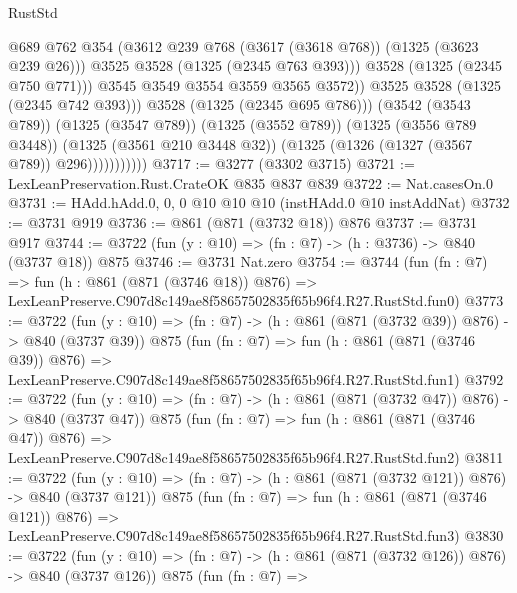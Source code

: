 \begin{lexlean}{RustStd}
\begin{coremodule}
                                  @689
                                  @762
                                  @354
                                  (@3612 @239 @768 (@3617 (@3618 @768)) (@1325 (@3623 @239 @26)))
                                  @3525
                                  @3528
                                  (@1325 (@2345 @763 @393)))
                                @3528
                                (@1325 (@2345 @750 @771)))
                              @3545
                              @3549
                              @3554
                              @3559
                              @3565
                              @3572))
                          @3525
                          @3528
                          (@1325 (@2345 @742 @393)))
                        @3528
                        (@1325 (@2345 @695 @786)))
                      (@3542 (@3543 @789))
                      (@1325 (@3547 @789))
                      (@1325 (@3552 @789))
                      (@1325 (@3556 @789 @3448))
                      (@1325 (@3561 @210 @3448 @32))
                      (@1325 (@1326 (@1327 (@3567 @789)) @296)))))))))))
@3717 := @3277 (@3302 @3715)
@3721 := LexLeanPreservation.Rust.CrateOK @835 @837 @839
@3722 := Nat.casesOn.{0}
@3731 := HAdd.hAdd.{0, 0, 0} @10 @10 @10 (instHAdd.{0} @10 instAddNat)
@3732 := @3731 @919
@3736 := @861 (@871 (@3732 @18)) @876
@3737 := @3731 @917
@3744 := @3722 (fun (y : @10) => (fn : @7) -> (h : @3736) -> @840 (@3737 @18)) @875
@3746 := @3731 Nat.zero
@3754 := @3744
    (fun (fn : @7) =>
    fun (h : @861 (@871 (@3746 @18)) @876) =>
    LexLeanPreserve.C907d8c149ae8f58657502835f65b96f4.R27.RustStd.fun0)
@3773 := @3722
    (fun (y : @10) => (fn : @7) -> (h : @861 (@871 (@3732 @39)) @876) -> @840 (@3737 @39))
    @875
    (fun (fn : @7) =>
    fun (h : @861 (@871 (@3746 @39)) @876) =>
    LexLeanPreserve.C907d8c149ae8f58657502835f65b96f4.R27.RustStd.fun1)
@3792 := @3722
    (fun (y : @10) => (fn : @7) -> (h : @861 (@871 (@3732 @47)) @876) -> @840 (@3737 @47))
    @875
    (fun (fn : @7) =>
    fun (h : @861 (@871 (@3746 @47)) @876) =>
    LexLeanPreserve.C907d8c149ae8f58657502835f65b96f4.R27.RustStd.fun2)
@3811 := @3722
    (fun (y : @10) => (fn : @7) -> (h : @861 (@871 (@3732 @121)) @876) -> @840 (@3737 @121))
    @875
    (fun (fn : @7) =>
    fun (h : @861 (@871 (@3746 @121)) @876) =>
    LexLeanPreserve.C907d8c149ae8f58657502835f65b96f4.R27.RustStd.fun3)
@3830 := @3722
    (fun (y : @10) => (fn : @7) -> (h : @861 (@871 (@3732 @126)) @876) -> @840 (@3737 @126))
    @875
    (fun (fn : @7) =>

\end{coremodule}
\end{lexlean}
